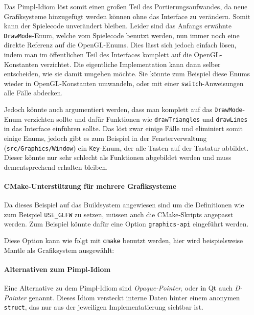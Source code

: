\documentclass[12pt, a4paper, titlepage, hidelinks]{scrreprt}
\begin{document}
Das Pimpl-Idiom löst somit einen großen Teil des Portierungsaufwandes, da neue Grafiksysteme hinzugefügt werden können ohne das Interface zu verändern. Somit kann der Spielecode unverändert bleiben. Leider sind das Anfangs erwähnte \texttt{DrawMode}-Enum, welche vom Spielecode benutzt werden, nun immer noch eine direkte Referenz auf die OpenGL-Enums. Dies lässt sich jedoch einfach lösen, indem man im öffentlichen Teil des Interfaces komplett auf die OpenGL-Konstanten verzichtet. Die eigentliche Implementation kann dann selber entscheiden, wie sie damit umgehen möchte. Sie könnte zum Beispiel diese Enums wieder in OpenGL-Konstanten umwandeln, oder mit einer \texttt{switch}-Anweisungen alle Fälle abdecken. 

Jedoch könnte auch argumentiert werden, dass man komplett auf das \texttt{DrawMode}-Enum verzichten sollte und dafür Funktionen wie \texttt{drawTriangles} und \texttt{drawLines} in das Interface einführen sollte. Das löst zwar einige Fälle und eliminiert somit einige Enums, jedoch gibt es zum Beispiel in der Fensterverwaltung (\texttt{src/Graphics/Window}) ein \texttt{Key}-Enum, der alle Tasten auf der Tastatur abbildet. Dieser könnte nur sehr schlecht als Funktionen abgebildet werden und muss dementsprechend erhalten bleiben.

\paragraph{CMake-Unterstützung für mehrere Grafiksysteme}
Da dieses Beispiel auf das Buildsystem angewiesen sind um die Definitionen wie zum Beispiel \texttt{USE\_GLFW} zu setzen, müssen auch die CMake-Skripts angepasst werden. Zum Beispiel könnte dafür eine Option \texttt{graphics-api} eingeführt werden.


Diese Option kann wie folgt mit \texttt{cmake} benutzt werden, hier wird beispielsweise Mantle als Grafiksystem ausgewählt:

\paragraph{Alternativen zum Pimpl-Idiom}
Eine Alternative zu dem Pimpl-Idiom sind \textit{Opaque-Pointer}, oder in Qt auch \textit{D-Pointer} genannt. Dieses Idiom versteckt interne Daten hinter einem anonymen \texttt{struct}, das nur aus der jeweiligen Implementatierung sichtbar ist. 
\end{document}
